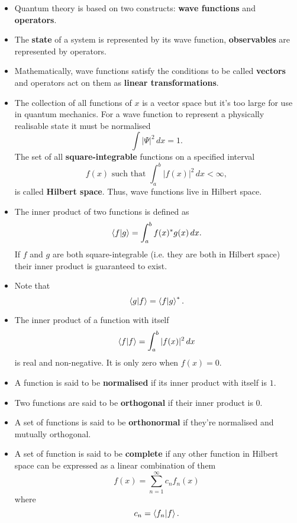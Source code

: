 \documentclass{article}
\begin{document}
\begin{itemize}
  \item Quantum theory is based on two constructs: \textbf{wave functions} and \textbf{operators}.

  \item The \textbf{state} of a system is represented by its wave function, \textbf{observables} are represented by operators.

  \item Mathematically, wave functions satisfy the conditions to be called \textbf{vectors} and operators act on them as \textbf{linear transformations}.

  \item The collection of all functions of $x$ is a vector space but it's too large for use in quantum mechanics. For a wave function to represent a physically realisable state it must be normalised \[\int |\Psi|^2 \,d x = 1.\] The set of all \textbf{square-integrable} functions on a specified interval \[f(x) \text{ such that } \int_a^b |f(x)|^2 \,d x < \infty,\] is called \textbf{Hilbert space}. Thus, wave functions live in Hilbert space.

  \item The inner product of two functions is defined as \[\braket{f | g} = \int_a^b f(x)^* g(x) \,d x.\] If $f$ and $g$ are both square-integrable (i.e. they are both in Hilbert space) their inner product is guaranteed to exist.

  \item Note that \[\braket{g | f} = \braket{f | g}^*.\]

  \item The inner product of a function with itself \[\braket{f | f} = \int_a^b |f(x)|^2 \,d x\] is real and non-negative. It is only zero when $f(x) = 0$.

  \item A function is said to be \textbf{normalised} if its inner product with itself is $1$.

  \item Two functions are said to be \textbf{orthogonal} if their inner product is $0$.

  \item A set of functions is said to be \textbf{orthonormal} if they're normalised and mutually orthogonal.

  \item A set of function is said to be \textbf{complete} if any other function in Hilbert space can be expressed as a linear combination of them \[f(x) = \sum_{n = 1}^\infty c_n f_n(x)\] where \[c_n = \braket{f_n | f}.\]
\end{itemize}
\end{document}
